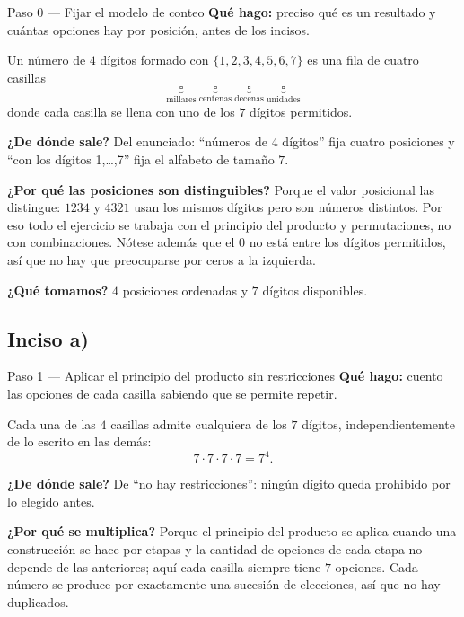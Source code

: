\documentclass[11pt]{article}
\begin{document}
\begin{paso}{Paso 0 --- Fijar el modelo de conteo}
\textbf{Qué hago:} preciso qué es un resultado y cuántas opciones hay por posición, antes de los incisos.

Un número de $4$ dígitos formado con $\{1,2,3,4,5,6,7\}$ es una fila de cuatro casillas
\[
\underbrace{\square}_{\text{millares}}\ \underbrace{\square}_{\text{centenas}}\ \underbrace{\square}_{\text{decenas}}\ \underbrace{\square}_{\text{unidades}}
\]
donde cada casilla se llena con uno de los $7$ dígitos permitidos.

\textbf{¿De dónde sale?} Del enunciado: ``números de 4 dígitos'' fija cuatro posiciones y ``con los dígitos 1,\dots,7'' fija el alfabeto de tamaño $7$.

\textbf{¿Por qué las posiciones son distinguibles?} Porque el valor posicional las distingue: $1234$ y $4321$ usan los mismos dígitos pero son números distintos. Por eso todo el ejercicio se trabaja con el principio del producto y permutaciones, no con combinaciones. Nótese además que el $0$ no está entre los dígitos permitidos, así que no hay que preocuparse por ceros a la izquierda.

\textbf{¿Qué tomamos?} $4$ posiciones ordenadas y $7$ dígitos disponibles.
\end{paso}

\subsection*{Inciso a)}

\begin{paso}{Paso 1 --- Aplicar el principio del producto sin restricciones}
\textbf{Qué hago:} cuento las opciones de cada casilla sabiendo que se permite repetir.

Cada una de las $4$ casillas admite cualquiera de los $7$ dígitos, independientemente de lo escrito en las demás:
\[
7\cdot 7\cdot 7\cdot 7 = 7^{4} .
\]

\textbf{¿De dónde sale?} De ``no hay restricciones'': ningún dígito queda prohibido por lo elegido antes.

\textbf{¿Por qué se multiplica?} Porque el principio del producto se aplica cuando una construcción se hace por etapas y la cantidad de opciones de cada etapa no depende de las anteriores; aquí cada casilla siempre tiene $7$ opciones. Cada número se produce por exactamente una sucesión de elecciones, así que no hay duplicados.
\end{paso}
\end{document}
